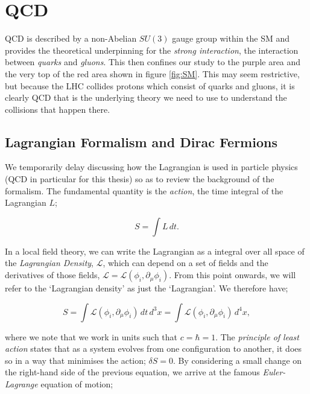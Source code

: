 \section{QCD}

QCD is described by a non-Abelian $SU(3)$ gauge group within the SM and provides the theoretical underpinning for the \emph{strong interaction}, the interaction between \emph{quarks} and \emph{gluons}. This then confines our study to the purple area and the very top of the red area shown in figure \ref{fig:SM}. This may seem restrictive, but because the LHC collides protons which consist of quarks and gluons, it is clearly QCD that is the underlying theory we need to use to understand the collisions that happen there. 

\subsection{Lagrangian Formalism and Dirac Fermions}
We temporarily delay discussing how the Lagrangian is used in particle physics (QCD in particular for this thesis) so as to review the background of the formalism. The fundamental quantity is the \emph{action}, the time integral of the Lagrangian $L$;

\begin{equation}
S = \int L \hspace{2pt} dt.
\end{equation}

In a local field theory, we can write the Lagrangian as a integral over all space of the \emph{Lagrangian Density}, $\mathscr{L}$, which can depend on a set of fields and the derivatives of those fields, $\mathscr{L} = \mathscr{L}(\phi_i, \partial_\mu \phi_i)$. From this point onwards, we will refer to the `Lagrangian density' as just the `Lagrangian'. We therefore have;

\begin{equation}
S = \int \mathscr{L} (\phi_i, \partial_\mu \phi_i) \hspace{2pt} dt \hspace{2pt} d^3 x = \int \mathscr{L} (\phi_i, \partial_\mu \phi_i) \hspace{2pt} d^4 x,
\end{equation}

where we note that we work in units such that $c = \hbar = 1$. The \emph{principle of least action} states that as a system evolves from one configuration to another, it does so in a way that minimises the action; $\delta S = 0$. By considering a small change on the right-hand side of the previous equation, we arrive at the famous \emph{Euler-Lagrange} equation of motion;

